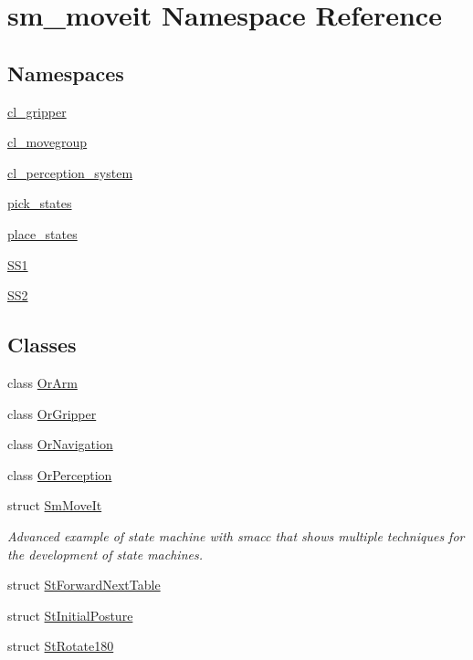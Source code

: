 \hypertarget{namespacesm__moveit}{}\section{sm\+\_\+moveit Namespace Reference}
\label{namespacesm__moveit}
\subsection*{Namespaces}
\begin{DoxyCompactItemize}
\item 
 \hyperlink{namespacesm__moveit_1_1cl__gripper}{cl\+\_\+gripper}
\item 
 \hyperlink{namespacesm__moveit_1_1cl__movegroup}{cl\+\_\+movegroup}
\item 
 \hyperlink{namespacesm__moveit_1_1cl__perception__system}{cl\+\_\+perception\+\_\+system}
\item 
 \hyperlink{namespacesm__moveit_1_1pick__states}{pick\+\_\+states}
\item 
 \hyperlink{namespacesm__moveit_1_1place__states}{place\+\_\+states}
\item 
 \hyperlink{namespacesm__moveit_1_1SS1}{S\+S1}
\item 
 \hyperlink{namespacesm__moveit_1_1SS2}{S\+S2}
\end{DoxyCompactItemize}
\subsection*{Classes}
\begin{DoxyCompactItemize}
\item 
class \hyperlink{classsm__moveit_1_1OrArm}{Or\+Arm}
\item 
class \hyperlink{classsm__moveit_1_1OrGripper}{Or\+Gripper}
\item 
class \hyperlink{classsm__moveit_1_1OrNavigation}{Or\+Navigation}
\item 
class \hyperlink{classsm__moveit_1_1OrPerception}{Or\+Perception}
\item 
struct \hyperlink{structsm__moveit_1_1SmMoveIt}{Sm\+Move\+It}
\begin{DoxyCompactList}\small\item\em Advanced example of state machine with smacc that shows multiple techniques for the development of state machines. \end{DoxyCompactList}\item 
struct \hyperlink{structsm__moveit_1_1StForwardNextTable}{St\+Forward\+Next\+Table}
\item 
struct \hyperlink{structsm__moveit_1_1StInitialPosture}{St\+Initial\+Posture}
\item 
struct \hyperlink{structsm__moveit_1_1StRotate180}{St\+Rotate180}
\end{DoxyCompactItemize}
